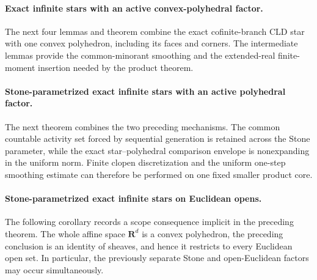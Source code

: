\paragraph{Exact infinite stars with an active convex-polyhedral factor.}
The next four lemmas and theorem combine the exact cofinite-branch CLD star
with one convex polyhedron, including its faces and corners.  The
intermediate lemmas provide the common-minorant smoothing and the
extended-real finite-moment insertion needed by the product theorem.








\paragraph{Stone-parametrized exact infinite stars with an active
polyhedral factor.}
The next theorem combines the two preceding mechanisms.  The common
countable activity set forced by sequential generation is retained across
the Stone parameter, while the exact star--polyhedral comparison envelope
is nonexpanding in the uniform norm.  Finite clopen discretization and the
uniform one-step smoothing estimate can therefore be performed on one
fixed smaller product core.




\paragraph{Stone-parametrized exact infinite stars on Euclidean opens.}
The following corollary records a scope consequence implicit in the
preceding theorem.  The whole affine space $\mathbf R^d$ is a convex
polyhedron, the preceding conclusion is an identity of sheaves, and hence
it restricts to every Euclidean open set.  In particular, the previously
separate Stone and open-Euclidean factors may occur simultaneously.

